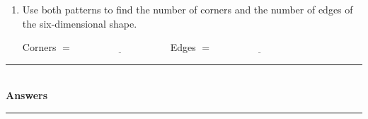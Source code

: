 \documentclass[12pt,a4paper]{article}
\newcommand{\ansline}[1][2.2cm]{\underline{\hspace{#1}}}
\newcommand{\heading}[1]{%
  \vspace{2pt}
  {\color{blue!45!black}\rule{\linewidth}{1pt}}\\[1pt]
  {\large\bfseries #1}\\[-6pt]
  {\color{blue!45!black}\rule{\linewidth}{0.4pt}}
  \vspace{2pt}}
\begin{document}
\begin{enumerate}[resume]
\begin{enumerate}
\vspace{6pt}
Square: $4=\ansline[3cm]$ \hfill Cube: $12=3\times2^2$ \hfill
Tesseract: $32=\ansline[3cm]$

\vspace{12pt}
\ansline[16cm]

\vspace{16pt}
\ansline[16cm]

\vspace{6pt}
  \item Use both patterns to find the number of corners and the number of edges
        of the six-dimensional shape.

\vspace{10pt}
Corners $=\ansline[4cm]$ \hfill Edges $=\ansline[4cm]$
\end{enumerate}

\end{enumerate}

\newpage

\heading{Answers}
\end{document}
